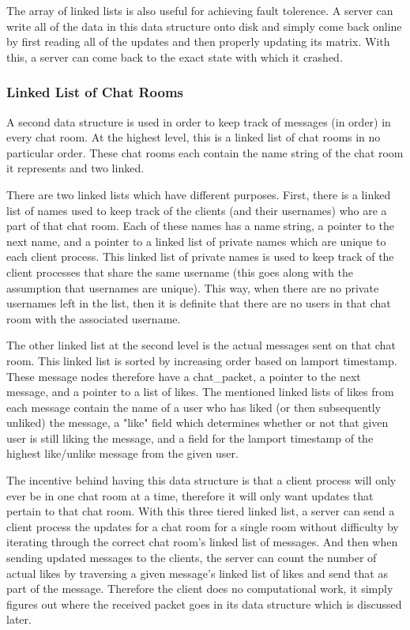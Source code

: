 \documentclass[12pt,journal,compsoc]{IEEEtran}
\begin{document}
The array of linked lists is also useful for achieving fault tolerence. A server can write all of the data in this data structure onto disk and simply come back online by first reading all of the updates and then properly updating its matrix. With this, a server can come back to the exact state with which it crashed.


\subsubsection{Linked List of Chat Rooms}
A second data structure is used in order to keep track of messages (in order) in every chat room. At the highest level, this is a linked list of chat rooms in no particular order. These chat rooms each contain the name string of the chat room it represents and two linked.

There are two linked lists which have different purposes. First, there is a linked list of names used to keep track of the clients (and their usernames) who are a part of that chat room. Each of these names has a name string, a pointer to the next name, and a pointer to a linked list of private names which are unique to each client process. This linked list of private names is used to keep track of the client processes that share the same username (this goes along with the assumption that usernames are unique). This way, when there are no private usernames left in the list, then it is definite that there are no users in that chat room with the associated username.

The other linked list at the second level is the actual messages sent on that chat room. This linked list is sorted by increasing order based on lamport timestamp. These message nodes therefore have a chat\_packet, a pointer to the next message, and a pointer to a list of likes. The mentioned linked lists of likes from each message contain the name of a user who has liked (or then subsequently unliked) the message, a "like" field which determines whether or not that given user is still liking the message, and a field for the lamport timestamp of the highest like/unlike message from the given user.

The incentive behind having this data structure is that a client process will only ever be in one chat room at a time, therefore it will only want updates that pertain to that chat room. With this three tiered linked list, a server can send a client process the updates for a chat room for a single room without difficulty by iterating through the correct chat room's linked list of messages. And then when sending updated messages to the clients, the server can count the number of actual likes by traversing a given message's linked list of likes and send that as part of the message. Therefore the client does no computational work, it simply figures out where the received packet goes in its data structure which is discussed later.
\end{document}
